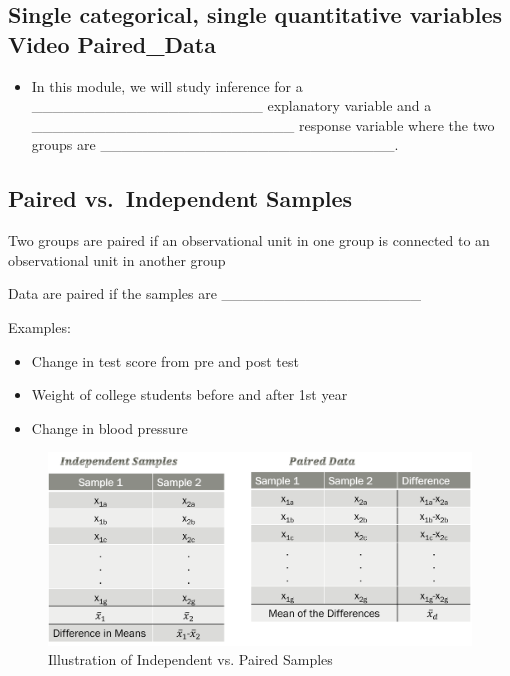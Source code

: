 \documentclass[
]{report}
\providecommand{\tightlist}{%
  \setlength{\itemsep}{0pt}\setlength{\parskip}{0pt}}
\newcommand{\rgi}{\hspace{24pt}}  %
\begin{document}

\subsection*{Single categorical, single quantitative variables Video Paired\_Data}\label{single-categorical-single-quantitative-variables-video-paired_data}

\begin{itemize}
\tightlist
\item
  In this module, we will study inference for a \_\_\_\_\_\_\_\_\_\_\_\_\_\_\_\_\_\_\_\_\_\_ explanatory variable and a \_\_\_\_\_\_\_\_\_\_\_\_\_\_\_\_\_\_\_\_\_\_\_\_\_ response variable where the two groups are \_\_\_\_\_\_\_\_\_\_\_\_\_\_\_\_\_\_\_\_\_\_\_\_\_\_\_\_.
\end{itemize}

\subsection*{Paired vs.~Independent Samples}\label{paired-vs.-independent-samples}

Two groups are paired if an observational unit in one group is connected to an observational unit in another group

\rgi Data are paired if the samples are \_\_\_\_\_\_\_\_\_\_\_\_\_\_\_\_\_\_\_

Examples:

\begin{itemize}
\item
  Change in test score from pre and post test
\item
  Weight of college students before and after 1st year
\item
  Change in blood pressure
\end{itemize}

\begin{figure}

{\centering \includegraphics[width=0.6\linewidth]{images/paired_independent} 

}

\caption{Illustration of Independent vs. Paired Samples}\label{fig:pairedindependent}
\end{figure}
\end{document}
